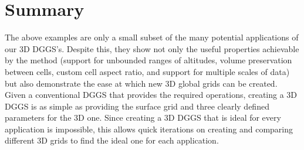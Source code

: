 \section{Summary}
The above examples are only a small subset of the many potential applications of our 3D DGGS's.
Despite this, they show not only the useful properties achievable by the method (support for unbounded ranges of altitudes, volume preservation between cells, custom cell aspect ratio, and support for multiple scales of data) but also demonstrate the ease at which new 3D global grids can be created.
Given a conventional DGGS that provides the required operations, creating a 3D DGGS is as simple as providing the surface grid and three clearly defined parameters for the 3D one.
Since creating a 3D DGGS that is ideal for every application is impossible, this allows quick iterations on creating and comparing different 3D grids to find the ideal one for each application.
